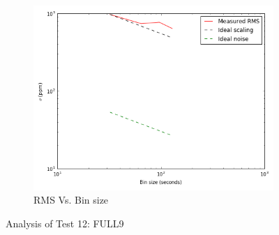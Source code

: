 \documentclass{aastex6}
\begin{document}
\begin{figure}[H]
    \begin{subfigure}{3}
        \includegraphics[scale=0.6]{rms_test12}
        \caption{RMS Vs. Bin size}
    \end{subfigure}
    \caption{Analysis of Test 12: FULL9}
\end{figure}
\end{document}
